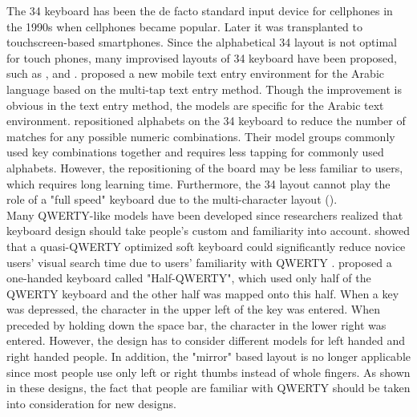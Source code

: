 \documentclass{singlecol-new}
\theoremstyle{TH}{
\newtheorem{lemma}{Lemma}
\newtheorem{theorem}[lemma]{Theorem}
\newtheorem{corrolary}[lemma]{Corrolary}
\newtheorem{conjecture}[lemma]{Conjecture}
\newtheorem{proposition}[lemma]{Proposition}
\newtheorem{claim}[lemma]{Claim}
\newtheorem{stheorem}[lemma]{Wrong Theorem}
\newtheorem{algorithm}{Algorithm}
}
\theoremstyle{THrm}{
\newtheorem{definition}{Definition}[section]
\newtheorem{question}{Question}[section]
\newtheorem{remark}{Remark}
\newtheorem{scheme}{Scheme}
}
\theoremstyle{THhit}{
\newtheorem{case}{Case}[section]
}
\begin{document}
The 34 keyboard has been the de facto standard input device for cellphones in the 1990s when cellphones became popular. Later it was transplanted to touchscreen-based smartphones. Since the alphabetical 34 layout is not optimal for touch phones, many improvised layouts of 34 keyboard have been proposed, such as \citet{al2011improving}, \citet{hwang2005qwerty} and \citet{mittal2009improvised}. \citet{al2011improving} proposed a new mobile text entry environment for the Arabic language based on the multi-tap text entry method. Though the improvement is obvious in the text entry method, the models are specific for the Arabic text environment. \citet{mittal2009improvised} repositioned alphabets on the 34 keyboard to reduce the number of matches for any possible numeric combinations. Their model groups commonly used key combinations together and requires less tapping for commonly used alphabets. However, the repositioning of the board may be less familiar to users, which requires long learning time. Furthermore, the 34 layout cannot play the role of a "full speed" keyboard due to the multi-character layout (\citep{hwang2005qwerty}). \\

Many QWERTY-like models have been developed since researchers realized that keyboard design should take people's custom and familiarity into account. \citet{bi2010quasi} showed that a quasi-QWERTY optimized soft keyboard could significantly reduce novice users' visual search time due to users' familiarity with QWERTY . \citet{matias1994half}proposed a one-handed keyboard called "Half-QWERTY", which used only half of the QWERTY keyboard and the other half was mapped onto this half. When a key was depressed, the character in the upper left of the key was entered. When preceded by holding down the space bar, the character in the lower right was entered. However, the design has to consider different models for left handed and right handed people. In addition, the "mirror" based layout is no longer applicable since most people use only left or right thumbs instead of whole fingers. As shown in these designs, the fact that people are familiar with QWERTY should be taken into consideration for new designs. \\
\end{document}

